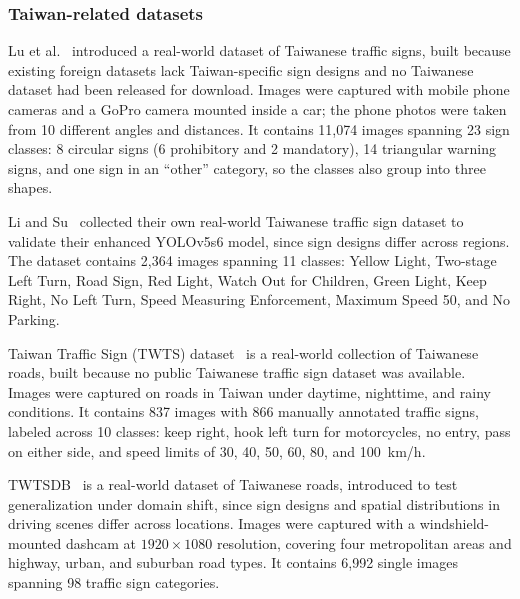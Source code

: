 \documentclass[runningheads]{llncs}
\begin{document}
\subsubsection{Taiwan-related datasets}
Lu et al.~\cite{lu2022hierarchical} introduced a real-world dataset of Taiwanese traffic signs, built because existing foreign datasets lack Taiwan-specific sign designs and no Taiwanese dataset had been released for download. Images were captured with mobile phone cameras and a GoPro camera mounted inside a car; the phone photos were taken from 10 different angles and distances. It contains 11,074 images spanning 23 sign classes: 8 circular signs (6 prohibitory and 2 mandatory), 14 triangular warning signs, and one sign in an ``other'' category, so the classes also group into three shapes.

Li and Su~\cite{li2022traffic} collected their own real-world Taiwanese traffic sign dataset to validate their enhanced YOLOv5s6 model, since sign designs differ across regions. The dataset contains 2,364 images spanning 11 classes: Yellow Light, Two-stage Left Turn, Road Sign, Red Light, Watch Out for Children, Green Light, Keep Right, No Left Turn, Speed Measuring Enforcement, Maximum Speed 50, and No Parking.

Taiwan Traffic Sign (TWTS) dataset~\cite{suwattanapunkul2023efficient} is a real-world collection of Taiwanese roads, built because no public Taiwanese traffic sign dataset was available. Images were captured on roads in Taiwan under daytime, nighttime, and rainy conditions. It contains 837 images with 866 manually annotated traffic signs, labeled across 10 classes: keep right, hook left turn for motorcycles, no entry, pass on either side, and speed limits of 30, 40, 50, 60, 80, and 100~km/h.

TWTSDB~\cite{lin2026csformer} is a real-world dataset of Taiwanese roads, introduced to test generalization under domain shift, since sign designs and spatial distributions in driving scenes differ across locations. Images were captured with a windshield-mounted dashcam at $1920\times1080$ resolution, covering four metropolitan areas and highway, urban, and suburban road types. It contains 6,992 single images spanning 98 traffic sign categories.
\end{document}
